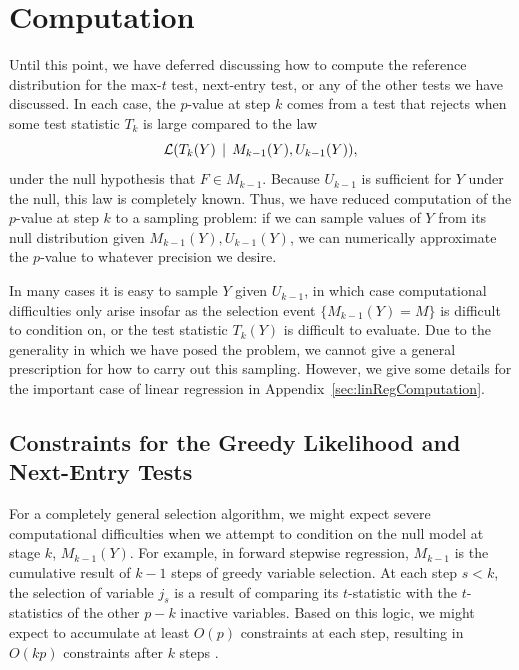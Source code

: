 \documentclass{article}
\begin{document}
\section{Computation}
\label{sec:computation}

Until this point, we have deferred discussing how to compute the reference distribution for the max-$t$ test, next-entry test, or any of the other tests we have discussed. In each case, the $p$-value at step $k$ comes from a test that rejects when some test statistic $T_k$ is large compared to the law
\begin{equation}\label{eq:genDist}
\mathcal{L}(T_k(Y) \,\mid\, M_{k-1}(Y), U_{k-1}(Y)),
\end{equation}
under the null hypothesis that $F\in M_{k-1}$. Because $U_{k-1}$ is sufficient for $Y$ under the null, this law is completely known. Thus, we have reduced computation of the $p$-value at step $k$ to a sampling problem: if we can sample values of $Y$ from its null distribution given $M_{k-1}(Y), U_{k-1}(Y)$, we can numerically approximate the $p$-value to whatever precision we desire.

In many cases it is easy to sample $Y$ given $U_{k-1}$, in which case computational difficulties only arise insofar as the selection event $\{M_{k-1}(Y)=M\}$ is difficult to condition on, or the test statistic $T_k(Y)$ is difficult to evaluate. Due to the generality in which we have posed the problem, we cannot give a general prescription for how to carry out this sampling. However, we give some details for the important case of linear regression in Appendix~\ref{sec:linRegComputation}.

\subsection{Constraints for the Greedy Likelihood and Next-Entry Tests}\label{sec:constraints}

For a completely general selection algorithm, we might expect severe computational difficulties when we attempt to condition on the null model at stage $k$, $M_{k-1}(Y)$. For example, in forward stepwise regression, $M_{k-1}$ is the cumulative result of $k-1$ steps of greedy variable selection. At each step $s<k$, the selection of variable $j_s$ is a result of comparing its $t$-statistic with the $t$-statistics of the other $p-k$ inactive variables. Based on this logic, we might expect to accumulate at least $O(p)$ constraints at each step, resulting in $O(kp)$ constraints after $k$ steps \citep{taylor2014exact}.
\end{document}

